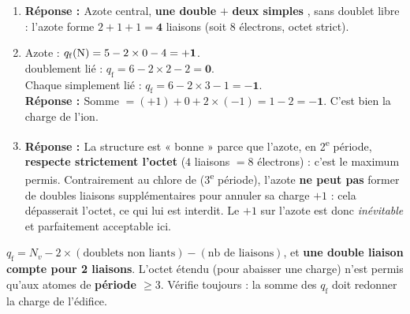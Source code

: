 \documentclass[11pt,a4paper]{article}
\newcommand{\rep}{\textbf{\textcolor{corcol}{Réponse : }}}
\begin{document}
\begin{cor}
\begin{enumerate}[label=\alph*),leftmargin=2em,itemsep=3pt]
  \item \rep Azote central, \textbf{une double}  $+$ \textbf{deux simples} ,
        sans doublet libre : l'azote forme $2 + 1 + 1 = \mathbf{4}$ liaisons (soit $8$ électrons,
        octet strict).
  \item Azote : $q_{\mathrm{f}}(\ce{N}) = 5 - 2\times 0 - 4 = \mathbf{+1}$.\\
         doublement lié : $q_{\mathrm{f}} = 6 - 2\times 2 - 2 = \mathbf{0}$.\\
        Chaque  simplement lié : $q_{\mathrm{f}} = 6 - 2\times 3 - 1 = \mathbf{-1}$.\\
        \rep Somme $= (+1) + 0 + 2\times(-1) = 1 - 2 = \mathbf{-1}$. \checkmark\; C'est bien la charge
        de l'ion.
  \item \rep La structure est « bonne » parce que l'azote, en 2\textsuperscript{e} période,
        \textbf{respecte strictement l'octet} ($4$ liaisons $= 8$ électrons) : c'est le maximum
        permis. Contrairement au chlore de  (3\textsuperscript{e} période), l'azote
        \textbf{ne peut pas} former de doubles liaisons supplémentaires pour annuler sa charge
        $+1$ : cela dépasserait l'octet, ce qui lui est interdit. Le $+1$ sur l'azote est donc
        \emph{inévitable} et parfaitement acceptable ici.
\end{enumerate}
\end{cor}

\begin{astucebox}
$q_{\mathrm{f}} = N_v - 2\times(\text{doublets non liants}) - (\text{nb de liaisons})$, et
\textbf{une double liaison compte pour 2 liaisons}. L'octet étendu (pour abaisser une charge) n'est
permis qu'aux atomes de \textbf{période $\geq 3$}. Vérifie toujours : la somme des $q_{\mathrm{f}}$
doit redonner la charge de l'édifice.
\end{astucebox}
\end{document}
